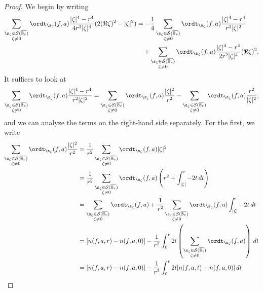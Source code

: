 \documentclass{amsart}
\begin{document}
\begin{proof}
    We begin by writing \begin{align*} \sum_{\substack{ \s_\zeta\in\mathcal{S}(\overline{\mathbb B_r}) \\ \zeta\neq 0}}\ordt_{\s_\zeta}(f,a)\frac{|\zeta|^4-r^4}{4r^2|\zeta|^4}(2(\Re \zeta)^2-|\zeta|^2) &= -\frac{1}{4}\sum_{\substack{ \s_\zeta\in\mathcal{S}(\overline{\mathbb B_r}) \\ \zeta\neq 0}}\ordt_{\s_\zeta}(f,a)\frac{|\zeta|^4-r^4}{r^2|\zeta|^2}\\ &\quad+\sum_{\substack{ \s_\zeta\in\mathcal{S}(\overline{\mathbb B_r}) \\ \zeta\neq 0}}
        \ordt_{\s_\zeta}(f,a) \frac{|\zeta|^4-r^4}{2r^2|\zeta|^4}(\Re \zeta)^2.\end{align*} It suffices to look at \[\sum_{\substack{ \s_\zeta\in\mathcal{S}(\overline{\mathbb B_r}) \\ \zeta\neq 0}}\ordt_{\s_\zeta}(f,a)\frac{|\zeta|^4-r^4}{r^2|\zeta|^2}=\sum_{\substack{ \s_\zeta\in\mathcal{S}(\overline{\mathbb B_r}) \\ \zeta\neq 0}}\ordt_{\s_\zeta}(f,a)\frac{|\zeta|^2}{r^2}-\sum_{\substack{ \s_\zeta\in\mathcal{S}(\overline{\mathbb B_r}) \\ \zeta\neq 0}}\ordt_{\s_\zeta}(f,a)\frac{r^2}{|\zeta|^2},\] and we can analyze the terms on the right-hand side separately. For the first, we write \begin{align}\label{quaIntCou3.1}
            \sum_{\substack{ \s_\zeta\in\mathcal{S}(\overline{\mathbb B_r}) \\ \zeta\neq 0}}\ordt_{\s_\zeta}(f,a)\frac{|\zeta|^2}{r^2} 
            &= \frac{1}{r^2} \sum_{\substack{ \s_\zeta\in\mathcal{S}(\overline{\mathbb B_r}) \\ \zeta\neq 0}}\ordt_{\s_\zeta}(f,a) |\zeta|^2 \nonumber\\
            &= \frac{1}{r^2} \sum_{\substack{ \s_\zeta\in\mathcal{S}(\overline{\mathbb B_r}) \\ \zeta\neq 0}}\ordt_{\s_\zeta}(f,a)\left(r^2+\int_{|\zeta|}^r-2t \,dt \right) \nonumber\\
            &= \sum_{\substack{ \s_\zeta\in\mathcal{S}(\overline{\mathbb B_r}) \\ \zeta\neq 0}}\ordt_{\s_\zeta}(f,a) +\frac{1}{r^2}\sum_{\substack{ \s_\zeta\in\mathcal{S}(\overline{\mathbb B_r}) \\ \zeta\neq 0}}\ordt_{\s_\zeta}(f,a)\int_{|\zeta|}^r-2t \,dt \nonumber\\ 
            &= [n(f,a,r)-n(f,a,0)]-\frac{1}{r^2}\int_0^r 2t \left(\sum_{\substack{ \s_\zeta\in\mathcal{S}(\overline{\mathbb B_t}) \\ \zeta\neq 0}}\ordt_{\s_\zeta}(f,a)\right)\, dt \nonumber\\
            &= [n(f,a,r)-n(f,a,0)]-\frac{1}{r^2}\int_0^r 2t [n(f,a,t)-n(f,a,0)] \,dt 
        \end{align}


\end{proof}
\end{document}
